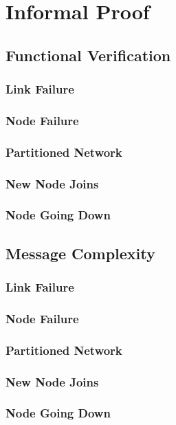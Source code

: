 \section{Informal Proof}\label{sec:informalProof}
\subsection{Functional Verification}\label{subsec:IPFunctionalVerification}
\subsubsection{Link Failure}\label{subsubsec:IPFVLinkFailure}
\subsubsection{Node Failure}\label{subsubsec:IPFVNodeFailure}
\subsubsection{Partitioned Network}\label{subsubsec:IPFVPartitionedNetwork}
\subsubsection{New Node Joins}\label{subsubsec:IPFVNewNodeJoins}
\subsubsection{Node Going Down}\label{subsubsec:IPFVNodeGoingDown}
\subsection{Message Complexity}\label{subsec:IPMessageComplexity}
\subsubsection{Link Failure}\label{subsubsec:IPMCLinkFailure}
\subsubsection{Node Failure}\label{subsubsec:IPMCNodeFailure}
\subsubsection{Partitioned Network}\label{subsubsec:IPMCPartitionedNetwork}
\subsubsection{New Node Joins}\label{subsubsec:IPMCNewNodeJoins}
\subsubsection{Node Going Down}\label{subsubsec:IPMCNodeGoingDown}